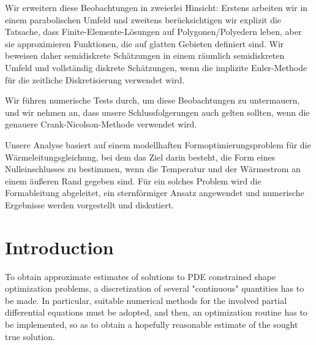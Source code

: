 \documentclass[english,a4paper,9pt,oneside]{scrbook}	%
\theoremstyle{break}
\theoremstyle{remark}
\begin{document}
Wir erweitern diese Beobachtungen in zweierlei Hinsicht: Erstens arbeiten wir in einem parabolischen Umfeld und zweitens berücksichtigen wir explizit die Tatsache, dass Finite-Elemente-Lösungen auf Polygonen/Polyedern leben, aber sie approximieren Funktionen, die auf glatten Gebieten definiert sind. Wir beweisen daher semidiskrete Schätzungen in einem räumlich semidiskreten Umfeld und vollständig diskrete Schätzungen, wenn die implizite Euler-Methode für die zeitliche Diskretisierung verwendet wird.

Wir führen numerische Tests durch, um diese Beobachtungen zu untermauern, und wir nehmen an, dass unsere Schlussfolgerungen auch gelten sollten, wenn die genauere Crank-Nicolson-Methode verwendet wird.

Unsere Analyse basiert auf einem modellhaften Formoptimierungsproblem für die Wärmeleitungsgleichung, bei dem das Ziel darin besteht, die Form eines Nulleinschlusses zu bestimmen, wenn die Temperatur und der Wärmestrom an einem äußeren Rand gegeben sind. Für ein solches Problem wird die Formableitung abgeleitet, ein sternförmiger Ansatz angewendet und numerische Ergebnisse werden vorgestellt und diskutiert.



\newpage
\tableofcontents  


\chapter{Introduction}  \setcounter{page}{1}   %

To obtain approximate estimates of solutions to PDE constrained shape optimization problems, a discretization of several "continuous" quantities has to be made. In particular, suitable numerical methods for the involved partial differential equations must be adopted, and then, an optimization routine has to be implemented, so as to obtain a hopefully reasonable estimate of the sought true solution.
\end{document}
